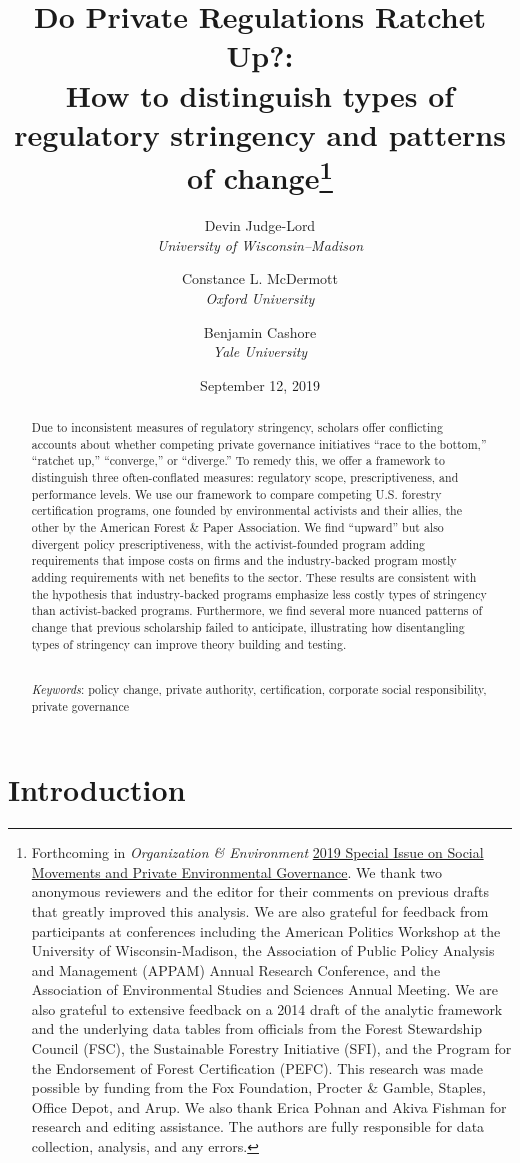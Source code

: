 \documentclass[
      12pt,
            Review ]{article}
\title{Do Private Regulations Ratchet Up?: 
           \\ How to distinguish types of regulatory stringency and patterns of change\thanks{Forthcoming in \emph{Organization \& Environment} \href{https://journals.sagepub.com/doi/full/10.1177/1086026619853783}{2019 Special Issue on Social Movements and Private Environmental Governance}. We thank two anonymous reviewers and the editor for their comments on previous drafts that greatly improved this analysis. We are also grateful for feedback from participants at conferences including the American Politics Workshop at the University of Wisconsin-Madison, the Association of Public Policy Analysis and Management (APPAM) Annual Research Conference, and the Association of Environmental Studies and Sciences Annual Meeting. We are also grateful to extensive feedback on a 2014 draft of the analytic framework and the underlying data tables from officials from the Forest Stewardship Council (FSC), the Sustainable Forestry Initiative (SFI), and the Program for the Endorsement of Forest Certification (PEFC). This research was made possible by funding from the Fox Foundation, Procter \& Gamble, Staples, Office Depot, and Arup. We also thank Erica Pohnan and Akiva Fishman for research and editing assistance. The authors are fully responsible for data collection, analysis, and any errors.}}
\author{ %
            Devin Judge-Lord  \\ \emph{University of Wisconsin--Madison} 
             \and 
            Constance L. McDermott  \\ \emph{Oxford University} 
             \and 
            Benjamin Cashore  \\ \emph{Yale University} 
            }
\date{September 12, 2019}
\begin{document}
 


  \maketitle




  \begin{abstract}
    \noindent Due to inconsistent measures of regulatory stringency, scholars offer conflicting accounts about whether competing private governance initiatives ``race to the bottom,'' ``ratchet up,'' ``converge,'' or ``diverge.'' To remedy this, we offer a framework to distinguish three often-conflated measures: regulatory scope, prescriptiveness, and performance levels. We use our framework to compare competing U.S. forestry certification programs, one founded by environmental activists and their allies, the other by the American Forest \& Paper Association. We find ``upward'' but also divergent policy prescriptiveness, with the activist-founded program adding requirements that impose costs on firms and the industry-backed program mostly adding requirements with net benefits to the sector. These results are consistent with the hypothesis that industry-backed programs emphasize less costly types of stringency than activist-backed programs. Furthermore, we find several more nuanced patterns of change that previous scholarship failed to anticipate, illustrating how disentangling types of stringency can improve theory building and testing. 

          \hfill \\ 
      \noindent \emph{Keywords}: policy change, private authority, certification, corporate social responsibility, private governance 
    
  \end{abstract}










\noindent 
      \doublespacing 
    \newpage

\hypertarget{introduction}{%
\section{Introduction}\label{introduction}}
\end{document}
